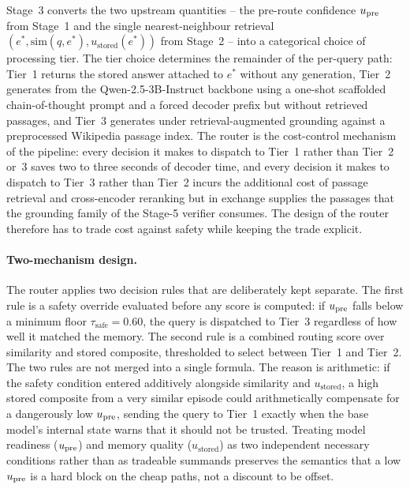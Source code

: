 Stage~3 converts the two upstream quantities -- the pre-route confidence $u_{\text{pre}}$ from Stage~1 and the single nearest-neighbour retrieval $(e^{*}, \mathrm{sim}(q, e^{*}), u_{\text{stored}}(e^{*}))$ from Stage~2 -- into a categorical choice of processing tier. The tier choice determines the remainder of the per-query path: Tier~1 returns the stored answer attached to $e^{*}$ without any generation, Tier~2 generates from the Qwen-2.5-3B-Instruct backbone using a one-shot scaffolded chain-of-thought prompt and a forced decoder prefix but without retrieved passages, and Tier~3 generates under retrieval-augmented grounding against a preprocessed Wikipedia passage index. The router is the cost-control mechanism of the pipeline: every decision it makes to dispatch to Tier~1 rather than Tier~2 or~3 saves two to three seconds of decoder time, and every decision it makes to dispatch to Tier~3 rather than Tier~2 incurs the additional cost of passage retrieval and cross-encoder reranking but in exchange supplies the passages that the grounding family of the Stage-5 verifier consumes. The design of the router therefore has to trade cost against safety while keeping the trade explicit.

\paragraph{Two-mechanism design.}
The router applies two decision rules that are deliberately kept separate. The first rule is a safety override evaluated before any score is computed: if $u_{\text{pre}}$ falls below a minimum floor $\tau_{\text{safe}} = 0.60$, the query is dispatched to Tier~3 regardless of how well it matched the memory. The second rule is a combined routing score over similarity and stored composite, thresholded to select between Tier~1 and Tier~2. The two rules are not merged into a single formula. The reason is arithmetic: if the safety condition entered additively alongside similarity and $u_{\text{stored}}$, a high stored composite from a very similar episode could arithmetically compensate for a dangerously low $u_{\text{pre}}$, sending the query to Tier~1 exactly when the base model's internal state warns that it should not be trusted. Treating model readiness ($u_{\text{pre}}$) and memory quality ($u_{\text{stored}}$) as two independent necessary conditions rather than as tradeable summands preserves the semantics that a low $u_{\text{pre}}$ is a hard block on the cheap paths, not a discount to be offset.

